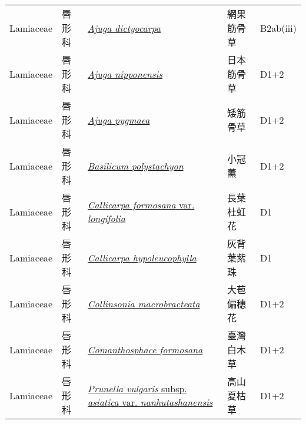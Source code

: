 {\begin{longtable}{p{2.5cm}p{2cm}p{5cm}p{2.5cm}p{3cm}}
    Lamiaceae & 唇形科 & \href{http://www.theplantlist.org/tpl1.1/search?q=Ajuga+dictyocarpa}{\textit{Ajuga dictyocarpa} } & 網果筋骨草 & B2ab(iii) \index{Ajuga@\textit{Ajuga}!dictyocarpa@\textit{dictyocarpa}}  \index{網果筋骨草} \\
    Lamiaceae & 唇形科 & \href{http://www.theplantlist.org/tpl1.1/search?q=Ajuga+nipponensis}{\textit{Ajuga nipponensis} } & 日本筋骨草 & D1+2 \index{Ajuga@\textit{Ajuga}!nipponensis@\textit{nipponensis}}  \index{日本筋骨草} \\
    Lamiaceae & 唇形科 & \href{http://www.theplantlist.org/tpl1.1/search?q=Ajuga+pygmaea}{\textit{Ajuga pygmaea} } & 矮筋骨草 & D1+2 \index{Ajuga@\textit{Ajuga}!pygmaea@\textit{pygmaea}}  \index{矮筋骨草} \\
    Lamiaceae & 唇形科 & \href{http://www.theplantlist.org/tpl1.1/search?q=Basilicum+polystachyon}{\textit{Basilicum polystachyon} } & 小冠薰 & D1+2 \index{Basilicum@\textit{Basilicum}!polystachyon@\textit{polystachyon}}  \index{小冠薰} \\
    Lamiaceae & 唇形科 & \href{http://www.theplantlist.org/tpl1.1/search?q=Callicarpa+formosana+var.+longifolia}{\textit{Callicarpa formosana} var. \textit{longifolia} } & 長葉杜虹花 & D1 \index{Callicarpa@\textit{Callicarpa}!formosana@\textit{formosana}!var. longifolia@var. \textit{longifolia}}  \index{長葉杜虹花} \\
    Lamiaceae & 唇形科 & \href{http://www.theplantlist.org/tpl1.1/search?q=Callicarpa+hypoleucophylla}{\textit{Callicarpa hypoleucophylla} } & 灰背葉紫珠 & D1 \index{Callicarpa@\textit{Callicarpa}!hypoleucophylla@\textit{hypoleucophylla}}  \index{灰背葉紫珠} \\
    Lamiaceae & 唇形科 & \href{http://www.theplantlist.org/tpl1.1/search?q=Collinsonia+macrobracteata}{\textit{Collinsonia macrobracteata} } & 大苞偏穗花 & D1+2 \index{Collinsonia@\textit{Collinsonia}!macrobracteata@\textit{macrobracteata}}  \index{大苞偏穗花} \\
    Lamiaceae & 唇形科 & \href{http://www.theplantlist.org/tpl1.1/search?q=Comanthosphace+formosana}{\textit{Comanthosphace formosana} } & 臺灣白木草 & D1+2 \index{Comanthosphace@\textit{Comanthosphace}!formosana@\textit{formosana}}  \index{臺灣白木草} \\
    Lamiaceae & 唇形科 & \href{http://www.theplantlist.org/tpl1.1/search?q=Prunella+vulgaris+subsp.+asiatica+var.+nanhutashanensis}{\textit{Prunella vulgaris} subsp. \textit{asiatica} var. \textit{nanhutashanensis} } & 高山夏枯草 & D1+2 \index{Prunella@\textit{Prunella}!vulgaris@\textit{vulgaris}!subsp. asiatica@subsp. \textit{asiatica}!var. nanhutashanensis@var. \textit{nanhutashanensis}}  \index{高山夏枯草} \\

\end{longtable}}
